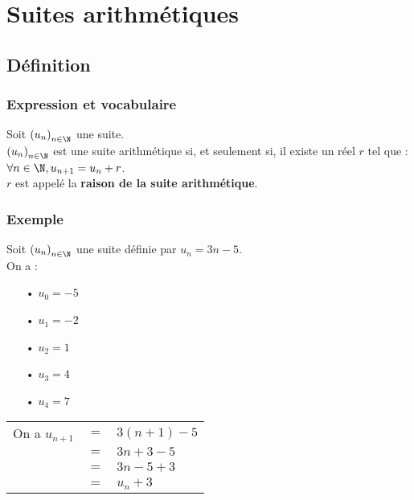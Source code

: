 
\ifdefined\COMPLETE
\else
    
    
\fi



\section{Suites arithmétiques}

\subsection{Définition}

\subsubsection{Expression et vocabulaire}

Soit $\left(u_n\right)_{n \in \N}$ une suite. \\

$\left(u_n\right)_{n \in \N}$ est une suite arithmétique si, et seulement si, il existe un réel $r$ tel que : \\
$\forall n \in \N, u_{n+1} = u_n + r$. \\

$r$ est appelé la \textbf{raison de la suite arithmétique}. 

\subsubsection{Exemple}
Soit $\left(u_n\right)_{n \in \N}$ une suite définie par $u_n = 3n - 5$. \\

On a : 

\begin{itemize}
\item[•] $u_0 = -5$
\item[•] $u_1 = -2$
\item[•] $u_2 = 1$
\item[•] $u_3 = 4$
\item[•] $u_4 = 7$
\end{itemize}

\vspace*{.3cm}

\begin{tabular}{lll}
On a $u_{n+1}$ & $ = $ & $ 3\left(n+1\right)-5$ \\
& $=$ & $3n + 3 - 5$ \\
& $=$ & $3n - 5 + 3$ \\
& $=$ & $u_n + 3$ \\
\end{tabular}

